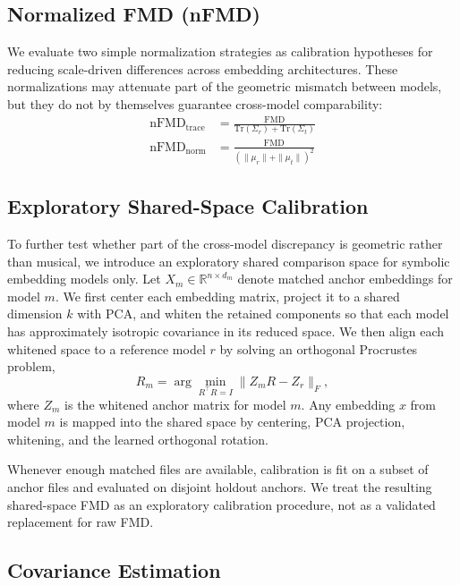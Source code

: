 \documentclass[a4paper]{article}
\begin{document}
\subsection{Normalized FMD (nFMD)}

We evaluate two simple normalization strategies as calibration hypotheses for reducing scale-driven differences across embedding architectures. These normalizations may attenuate part of the geometric mismatch between models, but they do not by themselves guarantee cross-model comparability:
\begin{align}
\text{nFMD}_{\text{trace}} &= \frac{\text{FMD}}{\text{Tr}(\Sigma_r) + \text{Tr}(\Sigma_t)} \\
\text{nFMD}_{\text{norm}} &= \frac{\text{FMD}}{(\|\mu_r\| + \|\mu_t\|)^2}
\end{align}

\subsection{Exploratory Shared-Space Calibration}

To further test whether part of the cross-model discrepancy is geometric rather than musical, we introduce an exploratory shared comparison space for symbolic embedding models only. Let $X_m \in \mathbb{R}^{n \times d_m}$ denote matched anchor embeddings for model $m$. We first center each embedding matrix, project it to a shared dimension $k$ with PCA, and whiten the retained components so that each model has approximately isotropic covariance in its reduced space. We then align each whitened space to a reference model $r$ by solving an orthogonal Procrustes problem,
\begin{equation}
R_m = \arg\min_{R^\top R = I} \|Z_m R - Z_r\|_F,
\end{equation}
where $Z_m$ is the whitened anchor matrix for model $m$. Any embedding $x$ from model $m$ is mapped into the shared space by centering, PCA projection, whitening, and the learned orthogonal rotation.

Whenever enough matched files are available, calibration is fit on a subset of anchor files and evaluated on disjoint holdout anchors. We treat the resulting shared-space FMD as an exploratory calibration procedure, not as a validated replacement for raw FMD.

\subsection{Covariance Estimation}
\end{document}
